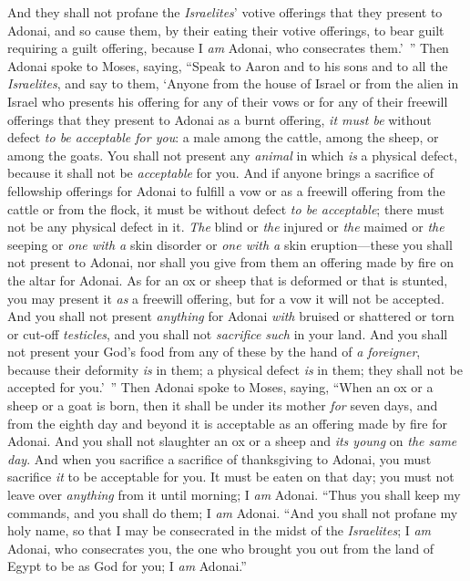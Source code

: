 \begin{biblechapter}
\verse And they shall not profane the \textit{Israelites}’ votive offerings that they present to Adonai,
\verse and so cause them, by their eating their votive offerings, to bear guilt requiring a guilt offering, because I \textit{am} Adonai, who consecrates them.’ ”
 Then Adonai spoke to Moses, saying,
\verse “Speak to Aaron and to his sons and to all the \textit{Israelites}, and say to them, ‘Anyone from the house of Israel or from the alien in Israel who presents his offering for any of their vows or for any of their freewill offerings that they present to Adonai as a burnt offering,
\verse \textit{it must be} without defect \textit{to be acceptable for you}: a male among the cattle, among the sheep, or among the goats.
\verse You shall not present any \textit{animal} in which \textit{is} a physical defect, because it shall not be \textit{acceptable} for you.
\verse And if anyone brings a sacrifice of fellowship offerings for Adonai to fulfill a vow or as a freewill offering from the cattle or from the flock, it must be without defect \textit{to be acceptable}; there must not be any physical defect in it.
\verse \textit{The} blind or \textit{the} injured or \textit{the} maimed or \textit{the} seeping or \textit{one with a} skin disorder or \textit{one with a} skin eruption—these you shall not present to Adonai, nor shall you give from them an offering made by fire on the altar for Adonai.
\verse As for an ox or sheep that is deformed or that is stunted, you may present it \textit{as} a freewill offering, but for a vow it will not be accepted.
\verse And you shall not present \textit{anything} for Adonai \textit{with} bruised or shattered or torn or cut-off \textit{testicles}, and you shall not \textit{sacrifice} \textit{such} in your land.
\verse And you shall not present your God’s food from any of these by the hand of \textit{a foreigner}, because their deformity \textit{is} in them; a physical defect \textit{is} in them; they shall not be accepted for you.’ ”
\verse Then Adonai spoke to Moses, saying,
\verse “When an ox or a sheep or a goat is born, then it shall be under its mother \textit{for} seven days, and from the eighth day and beyond it is acceptable as an offering made by fire for Adonai.
\verse And you shall not slaughter an ox or a sheep and \textit{its young} on \textit{the same day}.
\verse And when you sacrifice a sacrifice of thanksgiving to Adonai, you must sacrifice \textit{it} to be acceptable for you.
\verse It must be eaten on that day; you must not leave over \textit{anything} from it until morning; I \textit{am} Adonai.
\verse “Thus you shall keep my commands, and you shall do them; I \textit{am} Adonai.
\verse “And you shall not profane my holy name, so that I may be consecrated in the midst of the \textit{Israelites}; I \textit{am} Adonai, who consecrates you,
\verse the one who brought you out from the land of Egypt to be as God for you; I \textit{am} Adonai.”
\end{biblechapter}

